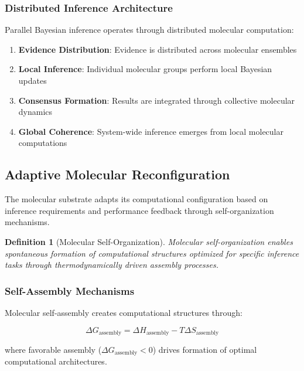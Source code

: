 \documentclass[12pt,a4paper]{article}
\newtheorem{definition}[theorem]{Definition}
\begin{document}
\subsubsection{Distributed Inference Architecture}

Parallel Bayesian inference operates through distributed molecular computation:

\begin{enumerate}
\item \textbf{Evidence Distribution}: Evidence is distributed across molecular ensembles
\item \textbf{Local Inference}: Individual molecular groups perform local Bayesian updates
\item \textbf{Consensus Formation}: Results are integrated through collective molecular dynamics
\item \textbf{Global Coherence}: System-wide inference emerges from local molecular computations
\end{enumerate}

\subsection{Adaptive Molecular Reconfiguration}

The molecular substrate adapts its computational configuration based on inference requirements and performance feedback through self-organization mechanisms.

\begin{definition}[Molecular Self-Organization]
Molecular self-organization enables spontaneous formation of computational structures optimized for specific inference tasks through thermodynamically driven assembly processes.
\end{definition}

\subsubsection{Self-Assembly Mechanisms}

Molecular self-assembly creates computational structures through:

\begin{equation}
\Delta G_{\text{assembly}} = \Delta H_{\text{assembly}} - T\Delta S_{\text{assembly}}
\end{equation}

where favorable assembly ($\Delta G_{\text{assembly}} < 0$) drives formation of optimal computational architectures.
\end{document}
